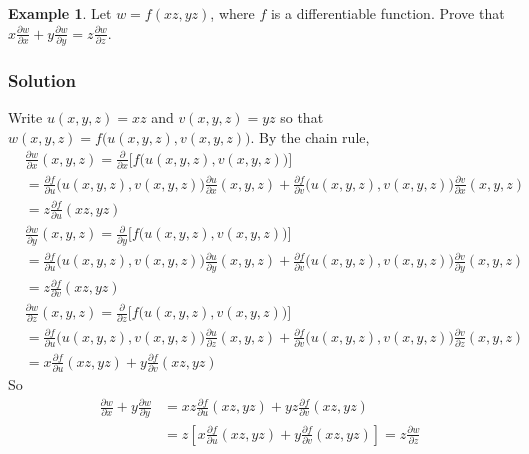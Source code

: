 \documentclass[10pt]{beamer}
\newcommand{\ds}{\displaystyle}
\theoremstyle{definition}
\newtheorem*{ex}{Example}
\newcommand{\pdiff}[2]{\frac{\partial #1}{\partial #2}}
\begin{document}
\begin{frame}
  \begin{ex}
    Let $w = f(x z, y z)$, where $f$ is a differentiable function. Prove that $\ds x\frac{\partial w}{\partial x} + y\frac{\partial w}{\partial y} = z\frac{\partial w}{\partial z}$.
  \end{ex}
\end{frame}

\begin{frame}[allowframebreaks]
  \frametitle{Solution}
  Write $u(x,y,z)=xz$ and $v(x,y,z)=yz$ so that $w(x,y,z) = f\big(u(x,y,z), v(x,y,z)\big)$. By the chain rule,
  \begin{align*}
    &\pdiff{w}{x}(x,y,z) = \pdiff{}{x}\big[f \big(u(x,y,z), v(x,y,z)\big)\big] \\
    &= \pdiff{f}{u}\big(u(x,y,z), v(x,y,z)\big)\pdiff{u}{x}(x,y,z) + \pdiff{f}{v}\big(u(x,y,z), v(x,y,z)\big)\pdiff{v}{x}(x,y,z) \\ 
    &= z\pdiff{f}{u}(xz, yz)
  \end{align*}
  \begin{align*}
    &\pdiff{w}{y}(x,y,z) = \pdiff{}{y}\big[f \big(u(x,y,z), v(x,y,z)\big)\big] \\
    &= \pdiff{f}{u}\big(u(x,y,z), v(x,y,z)\big)\pdiff{u}{y}(x,y,z) + \pdiff{f}{v}\big(u(x,y,z), v(x,y,z)\big)\pdiff{v}{y}(x,y,z) \\
    &= z\pdiff{f}{v}(xz, yz)
  \end{align*}
  \begin{align*}
    &\pdiff{w}{z}(x,y,z) = \pdiff{}{z}\big[f \big(u(x,y,z), v(x,y,z)\big)\big] \\
    &= \pdiff{f}{u}\big(u(x,y,z), v(x,y,z)\big)\pdiff{u}{z}(x,y,z) + \pdiff{f}{v}\big(u(x,y,z), v(x,y,z)\big)\pdiff{v}{z}(x,y,z) \\
    &= x\pdiff{f}{u}(xz, yz) + y\pdiff{f}{v}(xz, yz)
  \end{align*}
  So
  \begin{align*}
    \pdiff{w}{x} + y\pdiff{w}{y} &= xz\pdiff{f}{u}(xz, yz) + yz\pdiff{f}{v}(xz, yz) \\&= z\left[x\pdiff{f}{u}(xz, yz) + y\pdiff{f}{v}(xz, yz)\right] = z\pdiff{w}{z}
  \end{align*}
\end{frame}
\end{document}
